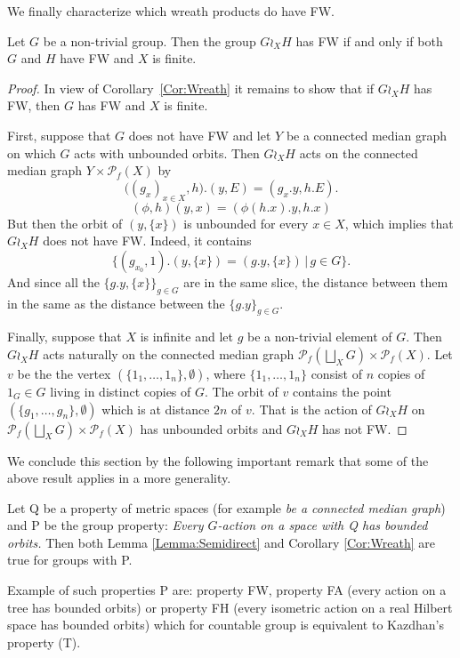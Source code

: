 We finally characterize which wreath products do have FW.
\begin{prop}\label{Prop:Median}
Let $G$ be a non-trivial group.
Then the group $G\wr_X H$ has FW if and only if both $G$ and $H$ have FW and $X$ is finite.
\end{prop}
\begin{proof}
In view of Corollary~\ref{Cor:Wreath} it remains to show that if $G\wr_X H$ has FW, then $G$ has FW and $X$ is finite.

First, suppose that $G$ does not have FW and let $Y$ be a connected median graph on which $G$ acts with unbounded orbits.
Then $G\wr_X H$ acts on the connected median graph $Y\times \mathcal P_f(X)$ by
\[
	\bigl((g_x)_{x\in X},h\bigr).(y,E)=(g_x.y,h.E).
\]
\[(\phi,h)(y,x) = (\phi(h.x).y, h.x)
\]
But then the orbit of $(y,\{x\})$ is unbounded for every $x\in X$, which implies that $G\wr_X H$ does not have FW.
Indeed, it contains
\[
	\{(g_{x_0},1).(y,\{x\})=(g.y,\{x\})\,|\,g\in G\}.
\]
And since all the $\{g.y,\{x\}\}_{g\in G}$ are in the same slice, the distance between them in the same as the distance between the $\{g.y\}_{g\in G}$.

Finally, suppose that $X$ is infinite and let $g$ be a non-trivial element of $G$.
Then $G\wr_X H$ acts naturally on the connected median graph $\mathcal P_f(\bigsqcup_XG)\times \mathcal P_f(X)$.
Let $v$ be the the vertex $(\{1_1,\dots, 1_n\},\emptyset)$, where $\{1_1,\dots, 1_n\}$ consist of $n$ copies of $1_G\in G$ living in distinct copies of $G$.
The orbit of $v$ contains the point $(\{g_1,\dots, g_n\},\emptyset)$ which is at distance $2n$ of $v$.
That is the action of $G\wr_X H$ on $\mathcal P_f(\bigsqcup_XG)\times \mathcal P_f(X)$ has unbounded orbits and $G\wr_X H$ has not FW.
\end{proof}

We conclude this section by the following important remark that some of the above result applies in a more generality.
\begin{rem}
Let Q be a property of metric spaces (for example \emph{be a connected median graph}) and P be the group property: \emph{Every $G$-action on a space with Q has bounded orbits.}
Then both Lemma \ref{Lemma:Semidirect} and Corollary \ref{Cor:Wreath} are true for groups with P.

Example of such properties P are: property FW, property FA (every action on a tree has bounded orbits) or property FH (every isometric action on a real Hilbert space has bounded orbits) which for countable group is equivalent to Kazdhan's property (T).
\end{rem}

